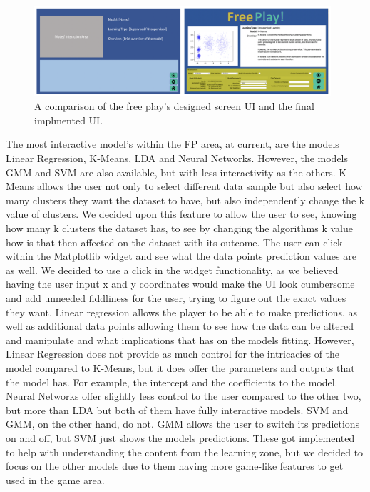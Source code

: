 	\begin{figure}[b]
		\begin{center}
			\includegraphics[width=11cm]{graphics/free_play.png}
			\caption{A comparison of the free play's designed screen UI and the final implmented UI.}
			\label{fig:ui_fp}
		\end{center}
	\end{figure}
	
	The most interactive model's within the FP area, at current, are the models Linear Regression, K-Means, LDA and Neural Networks. However, the models GMM and SVM are also available, but with less interactivity as the others. K-Means allows the user not only to select different data sample but also select how many clusters they want the dataset to have, but also independently change the k value of clusters. We decided upon this feature to allow the user to see, knowing how many k clusters the dataset has, to see by changing the algorithms k value how is that then affected on the dataset with its outcome. The user can click within the Matplotlib widget and see what the data points prediction values are as well. We decided to use a click in the widget functionality, as we believed having the user input x and y coordinates would make the UI look cumbersome and add unneeded fiddliness for the user, trying to figure out the exact values they want. Linear regression allows the player to be able to make predictions, as well as additional data points allowing them to see how the data can be altered and manipulate and what implications that has on the models fitting. However, Linear Regression does not provide as much control for the intricacies of the model compared to K-Means, but it does offer the parameters and outputs that the model has. For example, the intercept and the coefficients to the model. Neural Networks offer slightly less control to the user compared to the other two, but more than LDA but both of them have fully interactive models. SVM and GMM, on the other hand, do not. GMM allows the user to switch its predictions on and off, but SVM just shows the models predictions. These got implemented to help with understanding the content from the learning zone, but we decided to focus on the other models due to them having more game-like features to get used in the game area.
	
